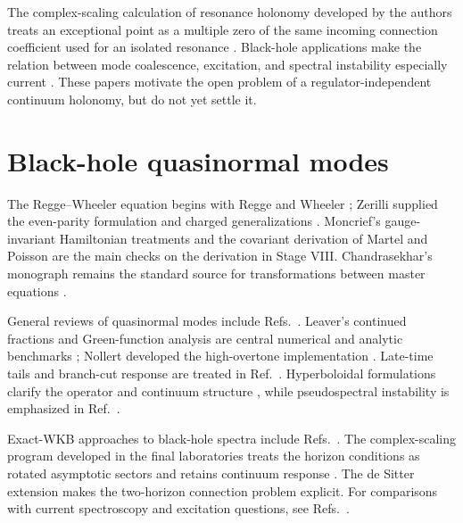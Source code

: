 The complex-scaling calculation of resonance holonomy developed by the
authors treats an exceptional point as a multiple zero of the same incoming
connection coefficient used for an isolated resonance
\cite{Morikawa:2025xjq}.  Black-hole applications make the relation between
mode coalescence, excitation, and spectral instability especially current
\cite{PanossoMacedo:2025xnf,Takahashi:2025uwo}.  These papers motivate the
open problem of a regulator-independent continuum holonomy, but do not yet
settle it.

\section*{Black-hole quasinormal modes}

The Regge--Wheeler equation begins with Regge and Wheeler
\cite{Regge:1957td}; Zerilli supplied the even-parity formulation and charged
generalizations \cite{Zerilli:1970wzz,Zerilli:1974ai}.  Moncrief's
gauge-invariant Hamiltonian treatments
\cite{Moncrief:1974gw,Moncrief:1974ng,Moncrief:1974am} and the covariant
derivation of Martel and Poisson \cite{Martel:2005ir} are the main checks on
the derivation in Stage VIII.  Chandrasekhar's monograph remains the standard
source for transformations between master equations
\cite{Chandrasekhar:book,Chandrasekhar:1975nkd}.

General reviews of quasinormal modes include
Refs.~\cite{Kokkotas:1999bd,Berti:2009kk,Konoplya:2011qq}.  Leaver's continued
fractions and Green-function analysis are central numerical and analytic
benchmarks \cite{Leaver:1985ax,Leaver:1986gd}; Nollert developed the
high-overtone implementation \cite{Nollert:1993zz}.  Late-time tails and
branch-cut response are treated in Ref.~\cite{Ching:1994bd}.  Hyperboloidal
formulations clarify the operator and continuum structure
\cite{Ansorg:2016ztf,PanossoMacedo:2024nkw}, while pseudospectral instability
is emphasized in Ref.~\cite{Jaramillo:2020tuu}.

Exact-WKB approaches to black-hole spectra include
Refs.~\cite{Hatsuda:2019eoj,Hatsuda:2021gtn,Hatsuda:2023geo,HatsudaShiga:2026}.
The complex-scaling program developed in the final laboratories treats the
horizon conditions as rotated asymptotic sectors and retains continuum
response \cite{Ogawa:2026veu,Ogawa:2026dSCSM}.  The de Sitter extension makes
the two-horizon connection problem explicit.  For comparisons with current
spectroscopy and excitation questions, see
Refs.~\cite{Motohashi:2024fwt,DeAmicis:2025xuh,Berti:2025hly,Su:2026fvj}.

